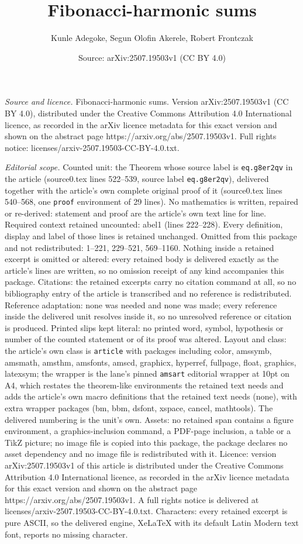 \documentclass[10pt,a4paper]{amsart}
\title[Fibonacci-harmonic sums]{Fibonacci-harmonic sums}
\author{Kunle Adegoke, Segun Olofin Akerele, Robert Frontczak}
\date{Source: arXiv:2507.19503v1 (CC BY 4.0)}
\begin{document}
\maketitle

\noindent\emph{Source and licence.} Fibonacci-harmonic sums. Version arXiv:2507.19503v1 (CC BY 4.0), distributed under the Creative Commons Attribution 4.0 International licence, as recorded in the arXiv licence metadata for this exact version and shown on the abstract page https://arxiv.org/abs/2507.19503v1. Full rights notice: licenses/arxiv-2507.19503-CC-BY-4.0.txt.\par\smallskip

\noindent\textit{Editorial scope.} Counted unit: the Theorem whose source label is \texttt{eq.g8er2qv} in the article (source0.tex lines 522--539, source label \texttt{eq.g8er2qv}), delivered together with the article's own complete original proof of it (source0.tex lines 540--568, one \texttt{proof} environment of 29 lines). No mathematics is written, repaired or re-derived: statement and proof are the article's own text line for line. Required context retained uncounted: abel1 (lines 222--228). Every definition, display and label of those lines is retained unchanged. Omitted from this package and not redistributed: 1--221, 229--521, 569--1160. Nothing inside a retained excerpt is omitted or altered: every retained body is delivered exactly as the article's lines are written, so no omission receipt of any kind accompanies this package. Citations: the retained excerpts carry no citation command at all, so no bibliography entry of the article is transcribed and no reference is redistributed. Reference adaptation: none was needed and none was made; every reference inside the delivered unit resolves inside it, so no unresolved reference or citation is produced. Printed slips kept literal: no printed word, symbol, hypothesis or number of the counted statement or of its proof was altered. Layout and class: the article's own class is \texttt{article} with packages including color, amssymb, amsmath, amsthm, amsfonts, amscd, graphicx, hyperref, fullpage, float, graphics, latexsym; the wrapper is the lane's pinned \texttt{amsart} editorial wrapper at 10pt on A4, which restates the theorem-like environments the retained text needs and adds the article's own macro definitions that the retained text needs (none), with extra wrapper packages (bm, bbm, dsfont, xspace, cancel, mathtools). The delivered numbering is the unit's own. Assets: no retained span contains a figure environment, a graphics-inclusion command, a PDF-page inclusion, a table or a TikZ picture; no image file is copied into this package, the package declares no asset dependency and no image file is redistributed with it. Licence: version arXiv:2507.19503v1 of this article is distributed under the Creative Commons Attribution 4.0 International licence, as recorded in the arXiv licence metadata for this exact version and shown on the abstract page https://arxiv.org/abs/2507.19503v1. A full rights notice is delivered at licenses/arxiv-2507.19503-CC-BY-4.0.txt. Characters: every retained excerpt is pure ASCII, so the delivered engine, XeLaTeX with its default Latin Modern text font, reports no missing character.
\end{document}
